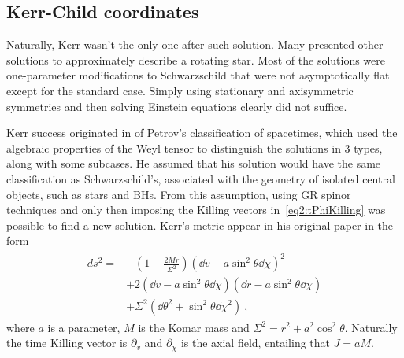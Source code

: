 \subsection{Kerr-Child coordinates}

Naturally, Kerr wasn't the only one after such solution.
Many presented other solutions to approximately describe a rotating star. 
Most of the solutions were one-parameter modifications to Schwarzschild that were not asymptotically flat except for the standard case. 
Simply using stationary and axisymmetric symmetries and then solving Einstein equations clearly did not suffice.

Kerr success originated in of Petrov's classification of spacetimes, which used the algebraic properties of the Weyl tensor to distinguish the solutions in 3 types, along with some subcases.
He assumed that his solution would have the same classification as Schwarzschild's, associated with the geometry of isolated central objects, such as stars and BHs. 
From this assumption, using GR spinor techniques and only then imposing the Killing vectors in~\eqref{eq2:tPhiKilling} was possible to find a new solution. 
Kerr's metric appear in his original paper in the form
\begin{align}
    \begin{split}
        ds^2 = &- \left(1 - \frac{2 M r}{\Sigma^2} \right) (\dd v - a \sin^2\theta \dd \chi )^2 \\
        &+ 2  (\dd v - a \sin^2\theta \dd \chi )  (\dd r - a \sin^2\theta \dd \chi ) \\
        &+ \Sigma^2 (\dd \theta^2 + \sin^2\theta \dd \chi^2 ) ~,
    \end{split}
    \label{eq2:KerrIngoingEF}
\end{align}
where $a$ is a parameter, $M$ is the Komar mass and $\Sigma^2 = r^2 + a^2 \cos^2\theta$. Naturally the time Killing vector is $\partial_v$ and $\partial_\chi$ is the axial field, entailing that $J = a M$.

